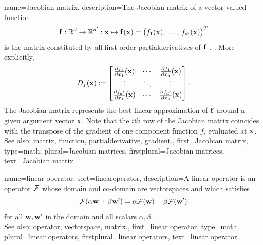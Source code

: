 {name={Jacobian matrix},
	description={The Jacobian \gls{matrix} of a \gls{vector}-valued \gls{function} 
		$${\bf f}:\mathbb{R}^{d}\rightarrow\mathbb{R}^{d'}: 
		{\bf x} \mapsto {\bf f}({\bf x}) = \big(f_{1}({\bf x}),\,\ldots,\,f_{d'}({\bf x}) \big)^{T}$$
		is the \gls{matrix} constituted by all first-order \glspl{partialderivative} of ${\bf f}$
		\cite{RudinBookPrinciplesMatheAnalysis}, \cite{HolderEichholz}. More explicitly, 
		\[
			D_{f}({\bf x})
			:=
			\begin{bmatrix}
				\frac{\partial f_{1}}{\partial x_{1}}({\bf x}) & \cdots &
				\frac{\partial f_{1}}{\partial x_{d}}({\bf x}) \\
				\vdots & \ddots & \vdots \\
				\frac{\partial f_{d'}}{\partial x_{1}}({\bf x}) & \cdots &
				\frac{\partial f_{d'}}{\partial x_{d}}({\bf x})
			\end{bmatrix}.
		\]
		The Jacobian \gls{matrix} represents the best linear approximation of ${\bf f}$
		around a given argument \gls{vector} ${\bf x}$. Note that the $i$th row of the Jacobian \gls{matrix} 
		coincides with the \gls{transpose} of the \gls{gradient} of one component \gls{function} 
		$f_i$ evaluated at ${\bf x}$.
		\\
		See also: \gls{matrix}, \gls{function}, \gls{partialderivative}, \gls{gradient}.},
	first={Jacobian matrix},
	type=math,
	plural={Jacobian matrices},
	firstplural={Jacobian matrices},
	text={Jacobian matrix}
}

{name={linear operator},
sort={linearoperator},
	description={A  linear \gls{operator} is an 
		\gls{operator} $\mathcal{F}$ whose \gls{domain} and \gls{co-domain} 
		are \glspl{vectorspace} and which satisfies \cite{DunfordSchwartz1988}
		\begin{equation}
			\nonumber
			\mathcal{F}(\alpha {\bf w} + \beta {\bf w}')
			= \alpha \mathcal{F}({\bf w}) + \beta \mathcal{F}({\bf w}')
		\end{equation}
		for all ${\bf w},{\bf w}'$ in the \gls{domain} and all scalars $\alpha,\beta$.
							\\
		See also: \gls{operator}, \gls{vectorspace}, \gls{matrix}.},
	first={linear operator},
	type=math,
	plural={linear operators},
	firstplural={linear operators},
	text={linear operator}
}

